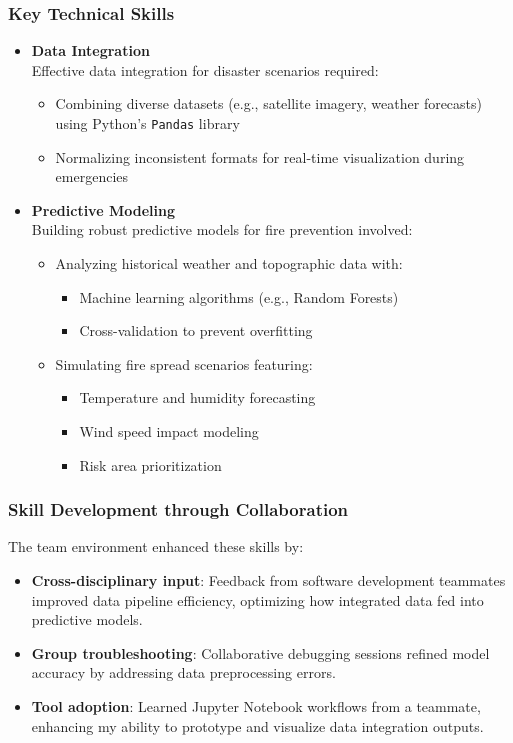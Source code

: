 \documentclass[a4paper, 11pt]{report}
\begin{document}
\subsubsection*{Key Technical Skills}
\begin{itemize}
    \item \textbf{Data Integration} \\
    Effective data integration for disaster scenarios required:
    \begin{itemize}
        \item Combining diverse datasets (e.g., satellite imagery, weather forecasts) using Python’s \texttt{Pandas} library
        \item Normalizing inconsistent formats for real-time visualization during emergencies
    \end{itemize}

    \item \textbf{Predictive Modeling} \\
    Building robust predictive models for fire prevention involved:
    \begin{itemize}
        \item Analyzing historical weather and topographic data with:
        \begin{itemize}
            \item Machine learning algorithms (e.g., Random Forests)
            \item Cross-validation to prevent overfitting
        \end{itemize}
        \item Simulating fire spread scenarios featuring:
        \begin{itemize}
            \item Temperature and humidity forecasting
            \item Wind speed impact modeling
            \item Risk area prioritization
        \end{itemize}
    \end{itemize}
\end{itemize}

\subsubsection*{Skill Development through Collaboration}
The team environment enhanced these skills by:
\begin{itemize}
    \item \textbf{Cross-disciplinary input}: Feedback from software development teammates improved data pipeline efficiency, optimizing how integrated data fed into predictive models.
    \item \textbf{Group troubleshooting}: Collaborative debugging sessions refined model accuracy by addressing data preprocessing errors.
    \item \textbf{Tool adoption}: Learned Jupyter Notebook workflows from a teammate, enhancing my ability to prototype and visualize data integration outputs.
\end{itemize}
\end{document}
